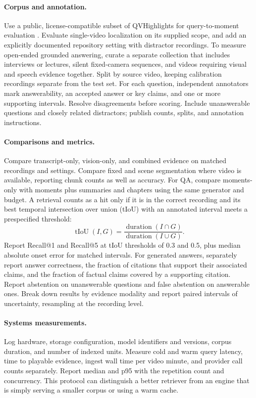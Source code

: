 \paragraph{Corpus and annotation.}
Use a public, license-compatible subset of QVHighlights for query-to-moment evaluation \cite{qvhighlights}. Evaluate single-video localization on its supplied scope, and add an explicitly documented repository setting with distractor recordings. To measure open-ended grounded answering, curate a separate collection that includes interviews or lectures, silent fixed-camera sequences, and videos requiring visual and speech evidence together. Split by source video, keeping calibration recordings separate from the test set. For each question, independent annotators mark answerability, an accepted answer or key claims, and one or more supporting intervals. Resolve disagreements before scoring. Include unanswerable questions and closely related distractors; publish counts, splits, and annotation instructions.

\paragraph{Comparisons and metrics.}
Compare transcript-only, vision-only, and combined evidence on matched recordings and settings. Compare fixed and scene segmentation where video is available, reporting chunk counts as well as accuracy. For QA, compare moments-only with moments plus summaries and chapters using the same generator and budget. A retrieval counts as a hit only if it is in the correct recording and its best temporal intersection over union (tIoU) with an annotated interval meets a prespecified threshold:
\begin{equation}
\operatorname{tIoU}(I,G)=
\frac{\operatorname{duration}(I\cap G)}{\operatorname{duration}(I\cup G)}.
\end{equation}
Report Recall@1 and Recall@5 at tIoU thresholds of 0.3 and 0.5, plus median absolute onset error for matched intervals. For generated answers, separately report answer correctness, the fraction of citations that support their associated claims, and the fraction of factual claims covered by a supporting citation. Report abstention on unanswerable questions and false abstention on answerable ones. Break down results by evidence modality and report paired intervals of uncertainty, resampling at the recording level.

\paragraph{Systems measurements.}
Log hardware, storage configuration, model identifiers and versions, corpus duration, and number of indexed units. Measure cold and warm query latency, time to playable evidence, ingest wall time per video minute, and provider call counts separately. Report median and p95 with the repetition count and concurrency. This protocol can distinguish a better retriever from an engine that is simply serving a smaller corpus or using a warm cache.

